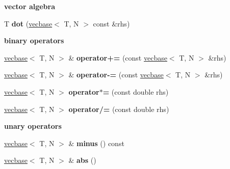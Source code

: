 \begin{Indent}{\bf vector algebra}\par
{\em \label{_amgrpf3df6783d0cca6c1ea518af64ed4d647}
 }\begin{DoxyCompactItemize}
\item 
\hypertarget{classmath_1_1vecbase_ae601a61c36ab5596610932ebe2f99f45}{
T {\bfseries dot} (\hyperlink{classmath_1_1vecbase}{vecbase}$<$ T, N $>$ const \&rhs)}
\label{classmath_1_1vecbase_ae601a61c36ab5596610932ebe2f99f45}

\end{DoxyCompactItemize}
\end{Indent}
\begin{Indent}{\bf binary operators}\par
{\em \label{_amgrp04c8a55c25fdc9a3444da113de31256d}
 }\begin{DoxyCompactItemize}
\item 
\hypertarget{classmath_1_1vecbase_aacfba6fee34bc6dfd105d955f675c74e}{
\hyperlink{classmath_1_1vecbase}{vecbase}$<$ T, N $>$ \& {\bfseries operator+=} (const \hyperlink{classmath_1_1vecbase}{vecbase}$<$ T, N $>$ \&rhs)}
\label{classmath_1_1vecbase_aacfba6fee34bc6dfd105d955f675c74e}

\item 
\hypertarget{classmath_1_1vecbase_a874c46c228e890efcbaa703b3a86b8f7}{
\hyperlink{classmath_1_1vecbase}{vecbase}$<$ T, N $>$ \& {\bfseries operator-\/=} (const \hyperlink{classmath_1_1vecbase}{vecbase}$<$ T, N $>$ \&rhs)}
\label{classmath_1_1vecbase_a874c46c228e890efcbaa703b3a86b8f7}

\item 
\hypertarget{classmath_1_1vecbase_a7a51537768ff2cde8b0a31fec39dee56}{
\hyperlink{classmath_1_1vecbase}{vecbase}$<$ T, N $>$ {\bfseries operator$\ast$=} (const double rhs)}
\label{classmath_1_1vecbase_a7a51537768ff2cde8b0a31fec39dee56}

\item 
\hypertarget{classmath_1_1vecbase_a06d655b27d88c726a2f5e9f100bc5e6a}{
\hyperlink{classmath_1_1vecbase}{vecbase}$<$ T, N $>$ {\bfseries operator/=} (const double rhs)}
\label{classmath_1_1vecbase_a06d655b27d88c726a2f5e9f100bc5e6a}

\end{DoxyCompactItemize}
\end{Indent}
\begin{Indent}{\bf unary operators}\par
{\em \label{_amgrp8839b6fa346915e1b72680f650c9b984}
 }\begin{DoxyCompactItemize}
\item 
\hypertarget{classmath_1_1vecbase_af814a8cd89b21afa5a0a156e2bb3bf72}{
\hyperlink{classmath_1_1vecbase}{vecbase}$<$ T, N $>$ \& {\bfseries minus} () const }
\label{classmath_1_1vecbase_af814a8cd89b21afa5a0a156e2bb3bf72}

\item 
\hypertarget{classmath_1_1vecbase_a0a02cdaf7cbaf2c454a8e124312bed5e}{
\hyperlink{classmath_1_1vecbase}{vecbase}$<$ T, N $>$ \& {\bfseries abs} ()}
\label{classmath_1_1vecbase_a0a02cdaf7cbaf2c454a8e124312bed5e}

\end{DoxyCompactItemize}
\end{Indent}
